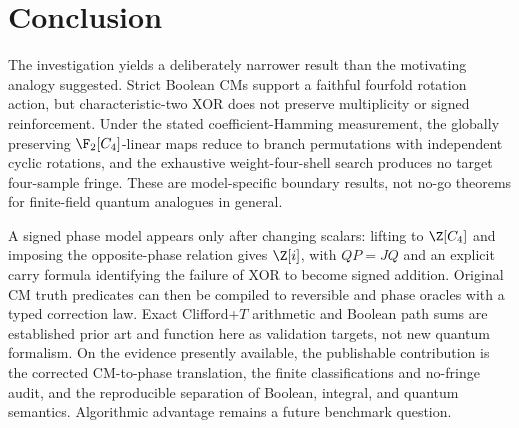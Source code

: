 \section{Conclusion}
The investigation yields a deliberately narrower result than the motivating analogy suggested.  Strict Boolean CMs support a faithful fourfold rotation action, but characteristic-two XOR does not preserve multiplicity or signed reinforcement.  Under the stated coefficient-Hamming measurement, the globally preserving $\F_2[C_4]$-linear maps reduce to branch permutations with independent cyclic rotations, and the exhaustive weight-four-shell search produces no target four-sample fringe.  These are model-specific boundary results, not no-go theorems for finite-field quantum analogues in general.

A signed phase model appears only after changing scalars: lifting to $\Z[C_4]$ and imposing the opposite-phase relation gives $\Z[i]$, with $QP=JQ$ and an explicit carry formula identifying the failure of XOR to become signed addition.  Original CM truth predicates can then be compiled to reversible and phase oracles with a typed correction law.  Exact Clifford+$T$ arithmetic and Boolean path sums are established prior art and function here as validation targets, not new quantum formalism.  On the evidence presently available, the publishable contribution is the corrected CM-to-phase translation, the finite classifications and no-fringe audit, and the reproducible separation of Boolean, integral, and quantum semantics.  Algorithmic advantage remains a future benchmark question.
